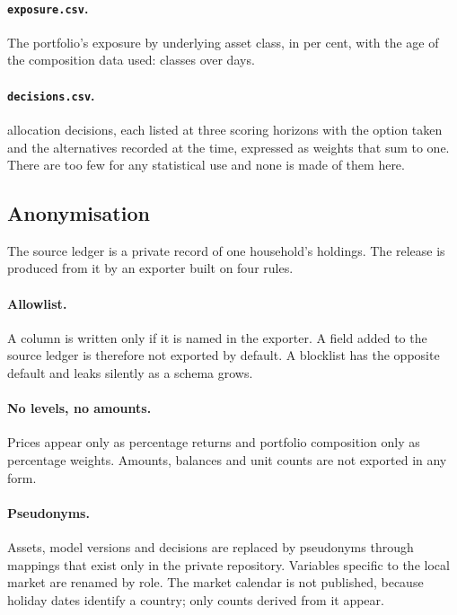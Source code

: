 \documentclass[11pt,a4paper]{article}
\begin{document}
\paragraph{\texttt{exposure.csv}.} The portfolio's exposure by underlying
asset class, in per cent, with the age of the composition data used:
\NumExpClasses{} classes over \NumExpDays{} days.

\paragraph{\texttt{decisions.csv}.} \NumDecisions{} allocation decisions, each
listed at three scoring horizons with the option taken and the alternatives
recorded at the time, expressed as weights that sum to one. There are too few
for any statistical use and none is made of them here.

\subsection{Anonymisation}\label{app:anon}

The source ledger is a private record of one household's holdings. The
release is produced from it by an exporter built on four rules.

\paragraph{Allowlist.} A column is written only if it is named in the
exporter. A field added to the source ledger is therefore not exported by
default. A blocklist has the opposite default and leaks silently as a schema
grows.

\paragraph{No levels, no amounts.} Prices appear only as percentage returns
and portfolio composition only as percentage weights. Amounts, balances and
unit counts are not exported in any form.

\paragraph{Pseudonyms.} Assets, model versions and decisions are replaced by
pseudonyms through mappings that exist only in the private repository.
Variables specific to the local market are renamed by role. The market
calendar is not published, because holiday dates identify a country; only
counts derived from it appear.
\end{document}
